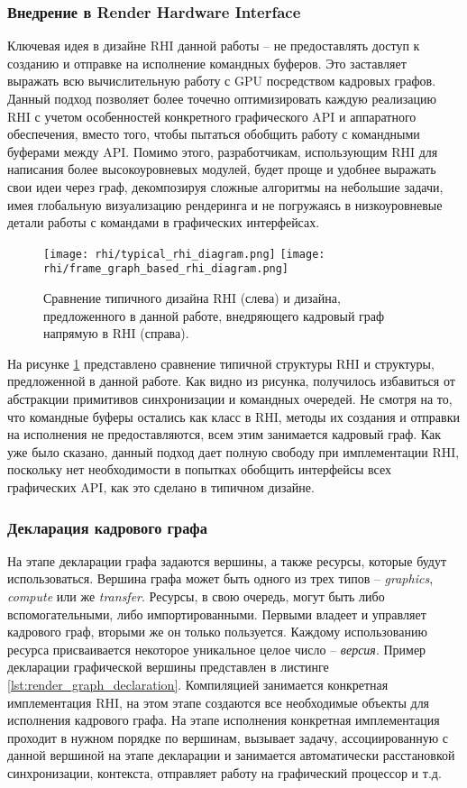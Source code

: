 \subsubsection{Внедрение в Render Hardware Interface}
Ключевая идея в дизайне RHI данной работы -- не предоставлять доступ к созданию и отправке на исполнение командных буферов. Это заставляет выражать всю вычислительную работу с GPU посредством кадровых графов. Данный подход позволяет более точечно оптимизировать каждую реализацию RHI с учетом особенностей конкретного графического API и аппаратного обеспечения, вместо того, чтобы пытаться обобщить работу с командными буферами между API. Помимо этого, разработчикам, использующим RHI для написания более высокоуровневых модулей, будет проще и удобнее выражать свои идеи через граф, декомпозируя сложные алгоритмы на небольшие задачи, имея глобальную визуализацию рендеринга и не погружаясь в низкоуровневые детали работы с командами в графических интерфейсах.

\begin{figure}[h]
    \centering
    \texttt{[image: rhi/typical\_rhi\_diagram.png]}
    \hfill
    \texttt{[image: rhi/frame\_graph\_based\_rhi\_diagram.png]}
    \caption{Сравнение типичного дизайна RHI (слева) и дизайна, предложенного в данной работе, внедряющего кадровый граф напрямую в RHI (справа).}
    \label{fig:rhi_design_comparison}
\end{figure}

На рисунке \ref{fig:rhi_design_comparison} представлено сравнение типичной структуры RHI и структуры, предложенной в данной работе. Как видно из рисунка, получилось избавиться от абстракции примитивов синхронизации и командных очередей. Не смотря на то, что командные буферы остались как класс в RHI, методы их создания и отправки на исполнения не предоставляются, всем этим занимается кадровый граф. Как уже было сказано, данный подход дает полную свободу при имплементации RHI, поскольку нет необходимости в попытках обобщить интерфейсы всех графических API, как это сделано в типичном дизайне.

\subsubsection{Декларация кадрового графа}
На этапе декларации графа задаются вершины, а также ресурсы, которые будут использоваться. Вершина графа может быть одного из трех типов -- \textit{graphics}, \textit{compute} или же \textit{transfer}. Ресурсы, в свою очередь, могут быть либо вспомогательными, либо импортированными. Первыми владеет и управляет кадрового граф, вторыми же он только пользуется. Каждому использованию ресурса присваивается некоторое уникальное целое число -- \textit{версия}. Пример декларации графической вершины представлен в листинге \ref{lst:render_graph_declaration}. Компиляцией занимается конкретная имплементация RHI, на этом этапе создаются все необходимые объекты для исполнения кадрового графа. На этапе исполнения конкретная имплементация проходит в нужном порядке по вершинам, вызывает задачу, ассоциированную с данной вершиной на этапе декларации и занимается автоматически расстановкой синхронизации, контекста, отправляет работу на графический процессор и т.д.

